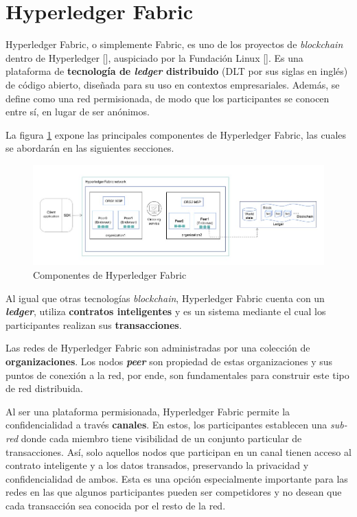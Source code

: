 \section{Hyperledger Fabric}

Hyperledger Fabric, o simplemente Fabric, es uno de los proyectos de \textit{blockchain} dentro de Hyperledger [\cite{hyperledger-foundation}], auspiciado por la Fundación Linux [\cite{linux-foundation}]. Es una plataforma de \textbf{tecnología de \textit{ledger} distribuido} (DLT por sus siglas en inglés) de código abierto, diseñada para su uso en contextos empresariales. Además, se define como una red permisionada, de modo que los participantes se conocen entre sí, en lugar de ser anónimos. 

La figura \ref{fig:hlfcomponents} expone las principales componentes de Hyperledger Fabric, las cuales se abordarán en las siguientes secciones. 

\begin{figure}[tbph]
\centering
\includegraphics[width=\textwidth]{Images/hlf_components}
\caption{Componentes de Hyperledger Fabric}
\label{fig:hlfcomponents}
\end{figure}


Al igual que otras tecnologías \textit{blockchain}, Hyperledger Fabric cuenta con un \textit{\textbf{ledger}}, utiliza \textbf{contratos inteligentes} y es un sistema mediante el cual los participantes realizan sus \textbf{transacciones}.

Las redes de Hyperledger Fabric son administradas por una colección de \textbf{organizaciones}. Los nodos \textit{\textbf{peer}} son propiedad de estas organizaciones y sus puntos de conexión a la red, por ende, son fundamentales para construir este tipo de red distribuida. 

Al ser una plataforma permisionada, Hyperledger Fabric permite la confidencialidad a través \textbf{canales}. En estos, los participantes establecen una \textit{sub-red} donde cada miembro tiene visibilidad de un conjunto particular de transacciones. Así, solo aquellos nodos que participan en un canal tienen acceso al contrato inteligente y a los datos transados, preservando la privacidad y confidencialidad de ambos.
Esta es una opción especialmente importante para las redes en las que algunos participantes pueden ser competidores y no desean que cada transacción sea conocida por el resto de la red. 

